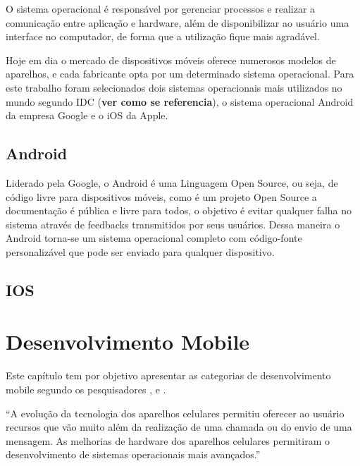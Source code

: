 	O sistema operacional é responsável por gerenciar processos e realizar a comunicação entre aplicação e hardware, além de disponibilizar ao usuário uma interface no computador, de forma que a utilização fique mais agradável. 
			
	Hoje em dia o mercado de dispositivos móveis oferece numerosos modelos de aparelhos, e cada fabricante opta por um determinado sistema operacional. Para este trabalho foram selecionados dois sistemas operacionais mais utilizados no mundo segundo IDC (\textbf{ver como se referencia}), o sistema operacional Android da empresa Google e o iOS da Apple.
		
	\subsection{Android}
			
		Liderado pela Google, o Android é uma Linguagem Open Source, ou seja, de código livre para dispositivos móveis, como é um projeto Open Source a documentação é pública e livre para todos, o objetivo é evitar qualquer falha no sistema através de feedbacks transmitidos por seus usuários. Dessa maneira o Android torna-se um sistema operacional completo com código-fonte personalizável que pode ser enviado para qualquer dispositivo.
				
				
	\subsection{IOS}
			
				
			
\section{Desenvolvimento Mobile}

	Este capítulo tem por objetivo apresentar as categorias de desenvolvimento mobile segundo os pesquisadores ,  e .

	\begin{citacao}
		“A evolução da tecnologia dos aparelhos celulares permitiu oferecer ao usuário recursos que vão muito além da realização de uma chamada ou do envio de uma mensagem. As melhorias de hardware dos aparelhos celulares permitiram o desenvolvimento de sistemas operacionais mais avançados.”\cite[]{da2014paradigmas}
	\end{citacao}
	
